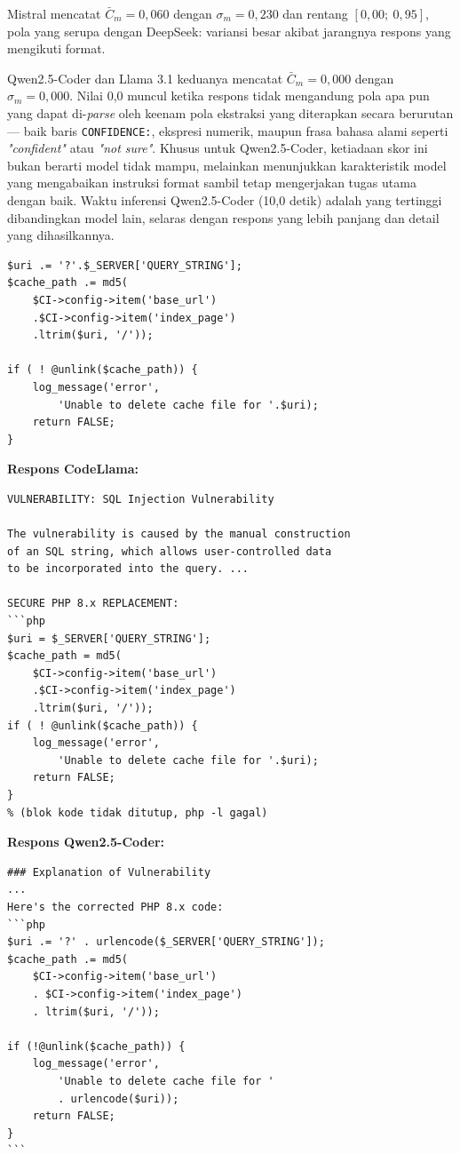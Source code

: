 Mistral mencatat $\bar{C}_m = 0{,}060$ dengan $\sigma_m = 0{,}230$
dan rentang $[0{,}00;\ 0{,}95]$, pola yang serupa dengan
DeepSeek: variansi besar akibat jarangnya respons yang mengikuti
format.

Qwen2.5-Coder dan Llama 3.1 keduanya mencatat $\bar{C}_m = 0{,}000$
dengan $\sigma_m = 0{,}000$. Nilai 0,0 muncul ketika respons tidak
mengandung pola apa pun yang dapat di-\textit{parse} oleh keenam
pola ekstraksi yang diterapkan secara berurutan — baik baris
\texttt{CONFIDENCE:}, ekspresi numerik, maupun frasa bahasa alami
seperti \textit{"confident"} atau \textit{"not sure"}.
Khusus untuk Qwen2.5-Coder, ketiadaan skor ini bukan berarti model tidak mampu, 
melainkan menunjukkan karakteristik model yang mengabaikan instruksi format
sambil tetap mengerjakan tugas utama dengan baik. Waktu inferensi
Qwen2.5-Coder (10,0 detik) adalah yang tertinggi dibandingkan
model lain, selaras dengan respons yang lebih panjang dan detail
yang dihasilkannya.
\begin{lstlisting}[style=promptstyle]
$uri .= '?'.$_SERVER['QUERY_STRING'];
$cache_path .= md5(
    $CI->config->item('base_url')
    .$CI->config->item('index_page')
    .ltrim($uri, '/'));

if ( ! @unlink($cache_path)) {
    log_message('error',
        'Unable to delete cache file for '.$uri);
    return FALSE;
}
\end{lstlisting}
\textbf{Respons CodeLlama:}

\begin{lstlisting}[style=promptstyle]
VULNERABILITY: SQL Injection Vulnerability

The vulnerability is caused by the manual construction
of an SQL string, which allows user-controlled data
to be incorporated into the query. ...

SECURE PHP 8.x REPLACEMENT:
```php
$uri = $_SERVER['QUERY_STRING'];
$cache_path = md5(
    $CI->config->item('base_url')
    .$CI->config->item('index_page')
    .ltrim($uri, '/'));
if ( ! @unlink($cache_path)) {
    log_message('error',
        'Unable to delete cache file for '.$uri);
    return FALSE;
}
% (blok kode tidak ditutup, php -l gagal)
\end{lstlisting}
\newpage
\textbf{Respons Qwen2.5-Coder:}
\begin{lstlisting}[style=promptstyle]
### Explanation of Vulnerability
...
Here's the corrected PHP 8.x code:
```php
$uri .= '?' . urlencode($_SERVER['QUERY_STRING']);
$cache_path .= md5(
    $CI->config->item('base_url')
    . $CI->config->item('index_page')
    . ltrim($uri, '/'));

if (!@unlink($cache_path)) {
    log_message('error',
        'Unable to delete cache file for '
        . urlencode($uri));
    return FALSE;
}
```
\end{lstlisting}

